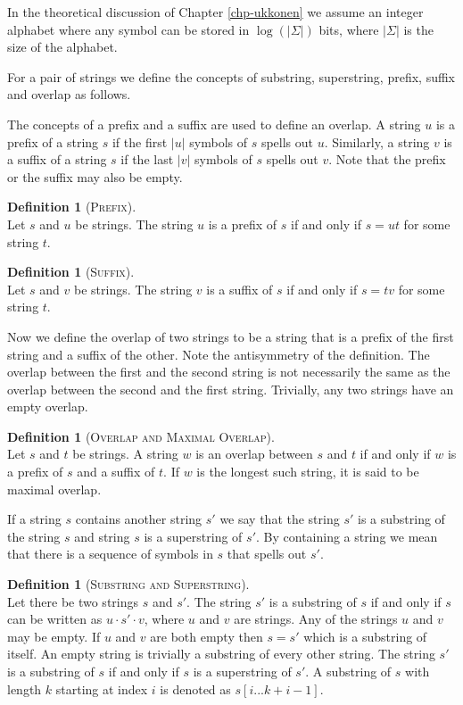 \documentclass[english,twoside,censored,csm,algorithms-track-2020]{HYthesisML}
\theoremstyle{plain}
\theoremstyle{definition}
\newtheorem{definition}[theorem]{Definition}
\numberwithin{testexample}{chapter}
\begin{document}
In the theoretical discussion of Chapter \ref{chp-ukkonen} we assume an integer alphabet
where any symbol can be stored in $\log (|\Sigma|)$ bits, where $|\Sigma|$ is the size of the alphabet.

For a pair of strings we define the concepts of substring, superstring, prefix, suffix and overlap
as follows.

The concepts of a prefix and a suffix are used to define an overlap. 
A string $u$ is a prefix of a string $s$ if the first $|u|$ symbols of $s$ spells out $u$.
Similarly, a string $v$ is a suffix of a string $s$ if the last $|v|$ symbols of $s$ spells out $v$.
Note that the prefix or the suffix may also be empty.

\begin{definition}[\textsc{Prefix}]~\label{def-prefix}\\
  Let $s$ and $u$ be strings. The string $u$ is a prefix of $s$ if and only if
  $s = ut$ for some string $t$.
\end{definition}

\begin{definition}[\textsc{Suffix}]~\label{def-suffix}\\
  Let $s$ and $v$ be strings. The string $v$ is a suffix of $s$ if and only if
  $s = tv$ for some string $t$. 
\end{definition}

Now we define the overlap of two strings to be a string that is a prefix of the first string
and a suffix of the other. Note the antisymmetry of the definition. The overlap between the first
and the second string is not necessarily the same as the overlap between the second and the first
string. Trivially, any two strings have an empty overlap.

\begin{definition}[\textsc{Overlap and Maximal Overlap}]~\label{def-overlap}\\
  Let $s$ and $t$ be strings. A string $w$ is an overlap between $s$ and $t$
  if and only if $w$ is a prefix of $s$ and a suffix of $t$.
  If $w$ is the longest such string, it is said to be maximal overlap.
\end{definition}

If a string $s$ contains another string $s'$ we say that the string $s'$ is a substring of the
string $s$ and string $s$ is a superstring of $s'$. 
By containing a string we mean that there is a sequence of symbols in $s$ that spells out $s'$.

\begin{definition}[\textsc{Substring and Superstring}]~\label{def-sub-super}\\
  Let there be two strings $s$ and $s'$.
  The string $s'$ is a substring of $s$ if and only if $s$ can be written as $u\cdot s'\cdot v$,
  where $u$ and $v$ are strings. Any of the strings $u$ and $v$ may be empty.
  If $u$ and $v$ are both empty then $s = s'$ which is a substring of itself.
  An empty string is trivially a substring of every other string.
  The string $s'$ is a substring of $s$ if and only if $s$ is a superstring of $s'$.
  A substring of $s$ with length $k$ starting at index $i$ is denoted
  as $s[i...k+i-1]$.
\end{definition}
\end{document}
